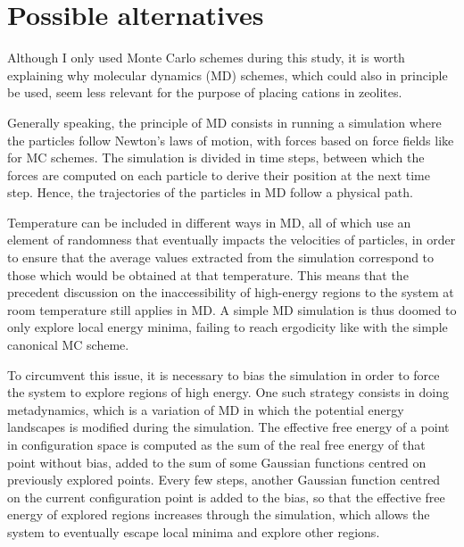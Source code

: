 \documentclass[main.tex]{subfiles}
\begin{document}
\section{Possible alternatives}

\label{metadynamics}

Although I only used Monte Carlo schemes during this study, it is worth explaining why molecular dynamics (MD) schemes, which could also in principle be used, seem less relevant for the purpose of placing cations in zeolites.

Generally speaking, the principle of MD consists in running a simulation where the particles follow Newton's laws of motion, with forces based on force fields like for MC schemes. The simulation is divided in time steps, between which the forces are computed on each particle to derive their position at the next time step. Hence, the trajectories of the particles in MD follow a physical path.

Temperature can be included in different ways in MD, all of which use an element of randomness that eventually impacts the velocities of particles, in order to ensure that the average values extracted from the simulation correspond to those which would be obtained at that temperature. This means that the precedent discussion on the inaccessibility of high-energy regions to the system at room temperature still applies in MD. A simple MD simulation is thus doomed to only explore local energy minima, failing to reach ergodicity like with the simple canonical MC scheme.

To circumvent this issue, it is necessary to bias the simulation in order to force the system to explore regions of high energy. One such strategy consists in doing metadynamics\autocite{Metadynamics}, which is a variation of MD in which the potential energy landscapes is modified during the simulation. The effective free energy of a point in configuration space is computed as the sum of the real free energy of that point without bias, added to the sum of some Gaussian functions centred on previously explored points. Every few steps, another Gaussian function centred on the current configuration point is added to the bias, so that the effective free energy of explored regions increases through the simulation, which allows the system to eventually escape local minima and explore other regions.
\end{document}
